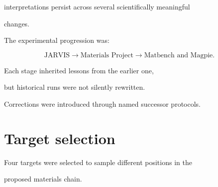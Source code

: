 \documentclass[11pt,a4paper,oneside]{report}
\begin{document}
interpretations persist across several scientifically meaningful

changes.



The experimental progression was:



\begin{equation}
\label{eq:programme-order}
\text{JARVIS}
\rightarrow
\text{Materials Project}
\rightarrow
\text{Matbench and Magpie}.
\end{equation}



Each stage inherited lessons from the earlier one,

but historical runs were not silently rewritten.



Corrections were introduced through named successor protocols.





\section{Target selection}



Four targets were selected to sample different positions in the

proposed materials chain.
\end{document}
